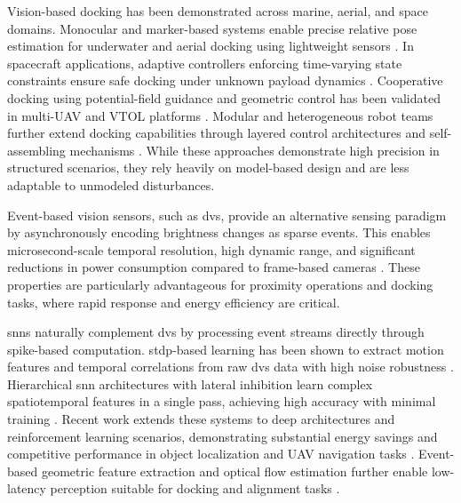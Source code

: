 Vision-based docking has been demonstrated across marine, aerial, and space domains. Monocular and marker-based systems enable precise relative pose estimation for underwater and aerial docking using lightweight sensors \cite{Trslic2020, Figueiredo2020}. In spacecraft applications, adaptive controllers enforcing time-varying state constraints ensure safe docking under unknown payload dynamics \cite{Sankaranarayanan2025}. Cooperative docking using potential-field guidance and geometric control has been validated in multi-UAV and VTOL platforms \cite{Nikhilraj2025, Narvaez2021}. Modular and heterogeneous robot teams further extend docking capabilities through layered control architectures and self-assembling mechanisms \cite{Lashkari2020, Li2022}. While these approaches demonstrate high precision in structured scenarios, they rely heavily on model-based design and are less adaptable to unmodeled disturbances.

Event-based vision sensors, such as \ac{dvs}, provide an alternative sensing paradigm by asynchronously encoding brightness changes as sparse events. This enables microsecond-scale temporal resolution, high dynamic range, and significant reductions in power consumption compared to frame-based cameras \cite{Lee2014RealTimeGesture, Seifozzakerini2018Hough, Bichler2012Extraction}. These properties are particularly advantageous for proximity operations and docking tasks, where rapid response and energy efficiency are critical.

\ac{snn}s naturally complement \ac{dvs} by processing event streams directly through spike-based computation. \ac{stdp}-based learning has been shown to extract motion features and temporal correlations from raw \ac{dvs} data with high noise robustness \cite{Bichler2012Extraction, Thiele2018EventBased}. Hierarchical \ac{snn} architectures with lateral inhibition learn complex spatiotemporal features in a single pass, achieving high accuracy with minimal training \cite{Zhao2014Feedforward}. Recent work extends these systems to deep architectures and reinforcement learning scenarios, demonstrating substantial energy savings and competitive performance in object localization and UAV navigation tasks \cite{Barchid2023Localization, Zanatta2023Directly, Salt2019Parameter}. Event-based geometric feature extraction and optical flow estimation further enable low-latency perception suitable for docking and alignment tasks \cite{Seifozzakerini2018Hough, Yang2024SelfSupervised}.

